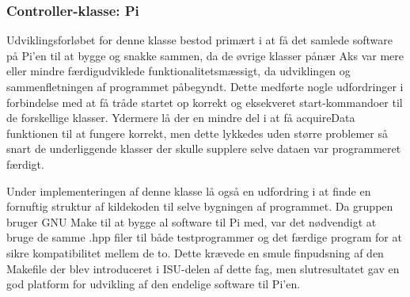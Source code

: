 \subsubsection{Controller-klasse: Pi} \label{sec:pi_class_impl}

Udviklingsforløbet for denne klasse bestod primært i at få det samlede software på Pi'en til at bygge og snakke sammen, da de øvrige klasser pånær Aks var mere eller mindre færdigudviklede funktionalitetsmæssigt, da udviklingen og sammenfletningen af programmet påbegyndt.
Dette medførte nogle udfordringer i forbindelse med at få tråde startet op korrekt og eksekveret start-kommandoer til de forskellige klasser.
Ydermere lå der en mindre del i at få acquireData funktionen til at fungere korrekt, men dette lykkedes uden større problemer så snart de underliggende klasser der skulle supplere selve dataen var programmeret færdigt.

Under implementeringen af denne klasse lå også en udfordring i at finde en fornuftig struktur af kildekoden til selve bygningen af programmet.
Da gruppen bruger GNU Make til at bygge al software til Pi med, var det nødvendigt at bruge de samme .hpp filer til både testprogrammer og det færdige program for at sikre kompatibilitet mellem de to.
Dette krævede en smule finpudsning af den Makefile der blev introduceret i ISU-delen af dette fag, men slutresultatet gav en god platform for udvikling af den endelige software til Pi'en.